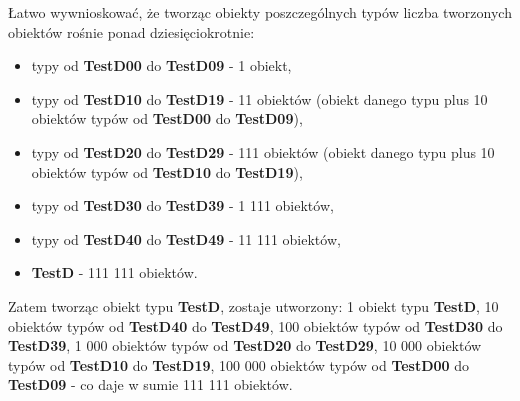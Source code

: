 \documentclass[12pt]{article}
\begin{document}
Łatwo wywnioskować, że tworząc obiekty poszczególnych typów liczba tworzonych obiektów rośnie ponad dziesięciokrotnie:
\begin{itemize}
	\item typy od \textbf{TestD00} do \textbf{TestD09} - 1 obiekt,
	\item typy od \textbf{TestD10} do \textbf{TestD19} - 11 obiektów (obiekt danego typu plus 10 obiektów typów od \textbf{TestD00} do \textbf{TestD09}),
	\item typy od \textbf{TestD20} do \textbf{TestD29} - 111 obiektów (obiekt danego typu plus 10 obiektów typów od \textbf{TestD10} do \textbf{TestD19}),
	\item typy od \textbf{TestD30} do \textbf{TestD39} - 1 111 obiektów,
	\item typy od \textbf{TestD40} do \textbf{TestD49} - 11 111 obiektów,
	\item \textbf{TestD} - 111 111 obiektów.
\end{itemize}
Zatem tworząc obiekt typu \textbf{TestD}, zostaje utworzony: 1 obiekt typu \textbf{TestD}, 10 obiektów typów od \textbf{TestD40} do \textbf{TestD49}, 100 obiektów typów od \textbf{TestD30} do \textbf{TestD39}, 1 000 obiektów typów od \textbf{TestD20} do \textbf{TestD29}, 10 000 obiektów typów od \textbf{TestD10} do \textbf{TestD19}, 100 000 obiektów typów od \textbf{TestD00} do \textbf{TestD09} - co daje w sumie 111 111 obiektów.
\end{document}
